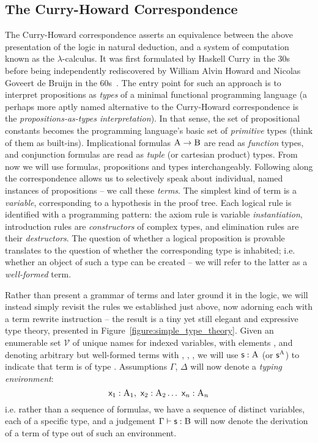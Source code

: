 \subsection{The Curry-Howard Correspondence}
The Curry-Howard correspondence asserts an equivalence between the above presentation of the logic in natural deduction, and a system of computation known as the $\lambda$-calculus.
It was first formulated by Haskell Curry in the 30s before being independently rediscovered by William Alvin Howard and Nicolas Goveert de Bruijn in the 60s~\cite{curry1934functionality,de1983automath,howard1980formulae}.
The entry point for such an approach is to interpret propositions as \textit{types} of a minimal functional programming language (a perhaps more aptly named alternative to the Curry-Howard correspondence is the \textit{propositions-as-types interpretation}).
In that sense, the set of propositional constants \propcon{} becomes the programming language's basic set of \textit{primitive} types (think of them as built-ins).
Implicational formulas $\prop A \to \prop B$ are read as \textit{function} types, and conjunction formulas are read as \textit{tuple} (or cartesian product) types.
From now we will use formulas, propositions and types interchangeably.
Following along the correspondence allows us to selectively speak about individual, named instances of propositions -- we call these \textit{terms}.
The simplest kind of term is a \textit{variable}, corresponding to a hypothesis in the proof tree.
Each logical rule is identified with a programming pattern: the axiom rule is variable \textit{instantiation}, introduction rules are \textit{constructors} of complex types, and elimination rules are their \textit{destructors}.
The question of whether a logical proposition is provable translates to the question of whether the corresponding type is inhabited; i.e. whether an object of such a type can be created -- we will refer to the latter as a \textit{well-formed} term.

Rather than present a grammar of terms and later ground it in the logic, we will instead simply revisit the rules we established just above, now adorning each with a term rewrite instruction -- the result is a tiny yet still elegant and expressive type theory, presented in Figure~\ref{figure:simple_type_theory}.
Given an enumerable set $\mathcal{V}$ of unique names for indexed variables, with elements , and denoting arbitrary but well-formed terms with , , , we will use $\term{s}: \prop{A}$ (or $\term{s}^{\smallprop{A}}$) to indicate that term  is of type .
Assumptions $\Gamma$, $\Delta$ will now denote a \textit{typing environment}:
\[
\term x_1 : \prop  A_1 ,~ \term x_2 : \prop A_2 \dots ~ \term x_n : \prop A_n
\]
i.e. rather than a sequence of formulas, we have a sequence of distinct variables, each of a specific type, and a judgement $\Gamma \vdash \term{s} : \prop{B}$ will now denote the derivation of a term  of type  out of such an environment.

